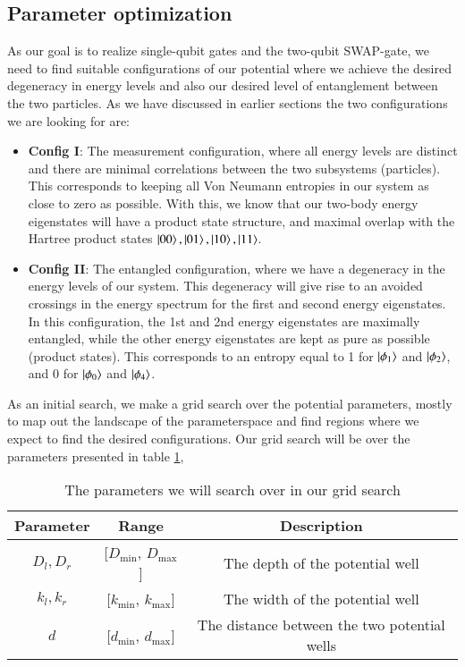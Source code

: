 \documentclass{subfiles}
\begin{document}
\subsection{Parameter optimization}\label{sec:optimization_procedure}
As our goal is to realize single-qubit gates and the two-qubit SWAP-gate, we need to find suitable configurations of our potential where we achieve the desired degeneracy in energy levels and also our desired level of entanglement between the two particles. As we have discussed in earlier sections the two configurations we are looking for are:
\begin{itemize}
    \item \textbf{Config I}: The measurement configuration, where all energy levels are distinct and there are minimal correlations between the two subsystems (particles). This corresponds to keeping all Von Neumann entropies in our system as close to zero as possible. With this, we know that our two-body energy eigenstates will have a product state structure, and maximal overlap with the Hartree product states $\ket{00}, \ket{01}, \ket{10}, \ket{11}$.
    \item \textbf{Config II}: The entangled configuration, where we have a degeneracy in the energy levels of our system. This degeneracy will give rise to an avoided crossings in the energy spectrum for the first and second energy eigenstates. In this configuration, the 1st and 2nd energy eigenstates are maximally entangled, while the other energy eigenstates are kept as pure as possible (product states). This corresponds to an entropy equal to 1 for $\ket{\phi_1}$ and $\ket{\phi_2}$, and 0 for $\ket{\phi_0}$ and $\ket{\phi_4}$. 
\end{itemize}
As an initial search, we make a grid search over the potential parameters, mostly to map out the landscape of the parameterspace and find regions where we expect to find the desired configurations. Our grid search will be over the parameters presented in table \ref{tab:parameter_search}, 
\begin{table}[h!]
    \centering
    \begin{tabular}{|c|c|c|}
        \hline
        Parameter & Range & Description \\
        \hline
        $D_l, D_r$ & [$D_{\text{min}}$, $D_{\text{max}}$] & The depth of the potential well \\
        $k_l, k_r$ & [$k_{\text{min}}$, $k_{\text{max}}$] & The width of the potential well \\
        $d$ & [$d_{\text{min}}$, $d_{\text{max}}$] & The distance between the two potential wells \\
        \hline
    \end{tabular}
    \caption{The parameters we will search over in our grid search}
    \label{tab:parameter_search}
\end{table}
\end{document}
